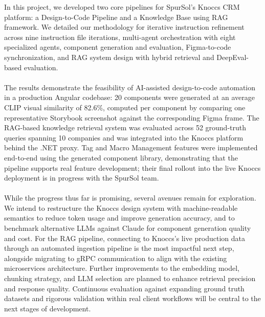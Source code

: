 In this project, we developed two core pipelines for SpurSol's Knoccs CRM platform: a Design-to-Code Pipeline and a Knowledge Base using RAG framework. We detailed our methodology for iterative instruction refinement across nine instruction file iterations, multi-agent orchestration with eight specialized agents, component generation and evaluation, Figma-to-code synchronization, and RAG system design with hybrid retrieval and DeepEval-based evaluation.
\\\\
The results demonstrate the feasibility of AI-assisted design-to-code automation in a production Angular codebase: 20 components were generated at an average CLIP visual similarity of 82.6\%, computed per component by comparing one representative Storybook screenshot against the corresponding Figma frame. The RAG-based knowledge retrieval system was evaluated across 52 ground-truth queries spanning 10 companies and was integrated into the Knoccs platform behind the .NET proxy. Tag and Macro Management features were implemented end-to-end using the generated component library, demonstrating that the pipeline supports real feature development; their final rollout into the live Knoccs deployment is in progress with the SpurSol team.
\\\\
While the progress thus far is promising, several avenues remain for exploration. We intend to restructure the Knoccs design system with machine-readable semantics to reduce token usage and improve generation accuracy, and to benchmark alternative LLMs against Claude for component generation quality and cost. For the RAG pipeline, connecting to Knoccs's live production data through an automated ingestion pipeline is the most impactful next step, alongside migrating to gRPC communication to align with the existing microservices architecture. Further improvements to the embedding model, chunking strategy, and LLM selection are planned to enhance retrieval precision and response quality. Continuous evaluation against expanding ground truth datasets and rigorous validation within real client workflows will be central to the next stages of development.
